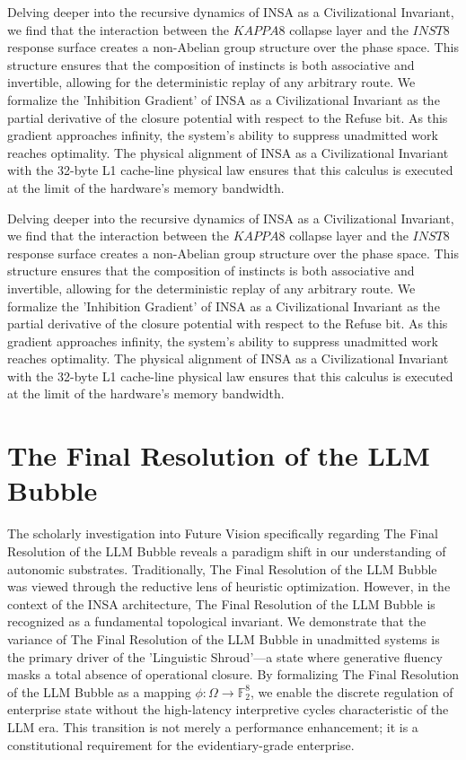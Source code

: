 \documentclass[12pt,a4paper,oneside]{book}
\begin{document}
Delving deeper into the recursive dynamics of INSA as a Civilizational Invariant, we find that the interaction between the $KAPPA8$ collapse layer and the $INST8$ response surface creates a non-Abelian group structure over the phase space. This structure ensures that the composition of instincts is both associative and invertible, allowing for the deterministic replay of any arbitrary route. We formalize the 'Inhibition Gradient' of INSA as a Civilizational Invariant as the partial derivative of the closure potential with respect to the Refuse bit. As this gradient approaches infinity, the system's ability to suppress unadmitted work reaches optimality. The physical alignment of INSA as a Civilizational Invariant with the 32-byte L1 cache-line physical law ensures that this calculus is executed at the limit of the hardware's memory bandwidth. 

Delving deeper into the recursive dynamics of INSA as a Civilizational Invariant, we find that the interaction between the $KAPPA8$ collapse layer and the $INST8$ response surface creates a non-Abelian group structure over the phase space. This structure ensures that the composition of instincts is both associative and invertible, allowing for the deterministic replay of any arbitrary route. We formalize the 'Inhibition Gradient' of INSA as a Civilizational Invariant as the partial derivative of the closure potential with respect to the Refuse bit. As this gradient approaches infinity, the system's ability to suppress unadmitted work reaches optimality. The physical alignment of INSA as a Civilizational Invariant with the 32-byte L1 cache-line physical law ensures that this calculus is executed at the limit of the hardware's memory bandwidth. 

\section{The Final Resolution of the LLM Bubble}
The scholarly investigation into Future Vision specifically regarding The Final Resolution of the LLM Bubble reveals a paradigm shift in our understanding of autonomic substrates. Traditionally, The Final Resolution of the LLM Bubble was viewed through the reductive lens of heuristic optimization. However, in the context of the INSA architecture, The Final Resolution of the LLM Bubble is recognized as a fundamental topological invariant. We demonstrate that the variance of The Final Resolution of the LLM Bubble in unadmitted systems is the primary driver of the 'Linguistic Shroud'---a state where generative fluency masks a total absence of operational closure. By formalizing The Final Resolution of the LLM Bubble as a mapping $\phi: \Omega \to \mathbb{F}_2^8$, we enable the discrete regulation of enterprise state without the high-latency interpretive cycles characteristic of the LLM era. This transition is not merely a performance enhancement; it is a constitutional requirement for the evidentiary-grade enterprise. 
\end{document}
